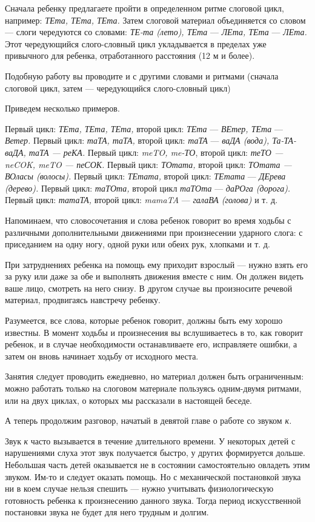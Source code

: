 \documentclass[a5paper]{book}
\renewcommand{\emph}[1]{\textit{#1}}
\begin{document}
Сначала ребенку предлагаете пройти в определенном ритме слоговой цикл,
например: \emph{ТЕта, ТЕта, ТЕта.} Затем слоговой материал объединяется
со словом --- слоги чередуются со словами: \emph{ТЕ-та (лето), ТЕта} ---
\emph{ЛЕта, ТЕта} --- \emph{ЛЕта.} Этот чередующийся слого-словный цикл
укладывается в пределах уже привычного для ребенка, отработанного
расстояния (12 м и более).

Подобную работу вы проводите и с другими словами и ритмами (сначала
слоговой цикл, затем --- чередующийся слого-словный цикл)

Приведем несколько примеров.

Первый цикл: \emph{ТЕта, ТЕта, ТЕта,} второй цикл: \emph{ТЕта} ---
\emph{ВЕтер, ТЕта} --- \emph{Ветер.} Первый цикл: \emph{таТА, таТА,}
второй цикл: \emph{таТА} --- \emph{ваДА (вода), Та-ТА-ваДА, таТА ---
реКА.} Первый цикл: \emph{meTO, me-ТО}, второй цикл: \emph{теТО ---
neCOK, meTO --- пеСОК.} Первый цикл: \emph{ТОтата,} второй цикл:
\emph{ТОтата --- ВОласы (волосы).} Первый цикл: \emph{ТЕтата,} второй
цикл: \emph{ТЕтата} --- \emph{ДЕрева (дерево).} Первый цикл:
\emph{таТОта,} второй цикл \emph{таТОта} --- \emph{даРОга (дорога).}
Первый цикл: \emph{татаТА,} второй цикл: \emph{mamaTA} --- \emph{галаВА
(голова)} и т. д.

Напоминаем, что словосочетания и слова ребенок говорит во время ходьбы с
различными дополнительными движениями при произнесении ударного слога: с
приседанием на одну ногу, одной руки или обеих рук, хлопками и т. д.

При затруднениях ребенка на помощь ему приходит взрослый --- нужно взять
его за руку или даже за обе и выполнять движения вместе с ним. Он должен
видеть ваше лицо, смотреть на него снизу. В другом случае вы произносите
речевой материал, продвигаясь навстречу ребенку.

Разумеется, все слова, которые ребенок говорит, должны быть ему хорошо
известны. В момент ходьбы и произнесения вы вслушиваетесь в то, как
говорит ребенок, и в случае необходимости останавливаете его,
исправляете ошибки, а затем он вновь начинает ходьбу от исходного места.

Занятия следует проводить ежедневно, но материал должен быть
ограниченным: можно работать только на слоговом материале пользуясь
одним-двумя ритмами, или на двух циклах, о которых мы рассказали в
настоящей беседе.

А теперь продолжим разговор, начатый в девятой главе о работе со звуком
\emph{к.}

Звук \emph{к} часто вызывается в течение длительного времени. У
некоторых детей с нарушениями слуха этот звук получается быстро, у
других формируется дольше. Небольшая часть детей оказывается не в
состоянии самостоятельно овладеть этим звуком. Им-то и следует оказать
помощь. Но с механической постановкой звука ни в коем случае нельзя
спешить --- нужно учитывать физиологическую готовность ребенка к
произнесению данного звука. Тогда период искусственной постановки звука
не будет для него трудным и долгим.
\end{document}
